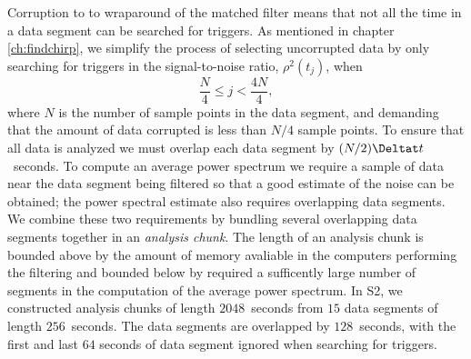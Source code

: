Corruption to to wraparound of the matched filter means that not all the time
in a data segment can be searched for triggers. As mentioned in chapter
\ref{ch:findchirp}, we simplify the process of selecting uncorrupted data by
only searching for triggers in the signal-to-noise ratio, $\rho^2(t_j)$, when 
\begin{equation}
\frac{N}{4} \le j < \frac{4N}{4},
\end{equation}
where $N$ is the number of sample points in the data segment, and demanding
that the amount of data corrupted is less than $N/4$ sample points. To ensure
that all data is analyzed we must overlap each data segment by $(N/2)\Deltat
t$~seconds. To compute an average power spectrum we require a sample of data
near the data segment being filtered so that a good estimate of the noise can
be obtained; the power spectral estimate also requires overlapping data
segments. We combine these two requirements by bundling several overlapping
data segments together in an \emph{analysis chunk}. The length of an analysis
chunk is bounded above by the amount of memory avaliable in the computers
performing the filtering and bounded below by required a sufficently large
number of segments in the computation of the average power spectrum. In S2, we
constructed analysis chunks of length $2048$~seconds from $15$ data segments
of length $256$~seconds. The data segments are overlapped by $128$~seconds,
with the first and last $64$ seconds of data segment ignored when searching
for triggers. 

